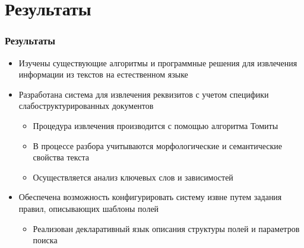\documentclass{beamer}
\begin{document}

\section{Результаты}
\begin{frame}
\frametitle{Результаты}
\begin{itemize}
	\item Изучены существующие алгоритмы и программные решения для извлечения информации из текстов на естественном языке
	\item Разработана система для извлечения реквизитов с учетом специфики слабоструктурированных документов
	\begin{itemize}
		\item Процедура извлечения производится с помощью алгоритма Томиты
		\item В процессе разбора учитываются морфологические и семантические свойства текста
		\item Осуществляется анализ ключевых слов и зависимостей
	\end{itemize}
	\item Обеспечена возможность конфигурировать систему извне путем задания правил, описывающих шаблоны полей
	\begin{itemize}
		\item Реализован декларативный язык описания структуры полей и параметров поиска
	\end{itemize}
\end{itemize}
\end{frame}
\end{document}
